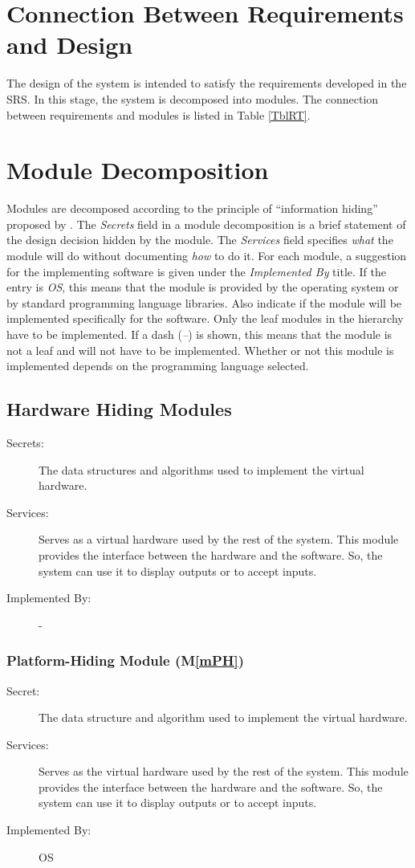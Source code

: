 \documentclass[12pt, titlepage]{article}
\newcommand{\mref}[1]{M\ref{#1}}
\begin{document}
	\section{Connection Between Requirements and Design} \label{SecConnection}
	The design of the system is intended to satisfy the requirements developed 
	in the SRS. In this stage, the system is decomposed into modules. The 
	connection between requirements and modules is listed in Table \ref{TblRT}.
	\section{Module Decomposition} \label{SecMD}
	Modules are decomposed according to the principle of ``information hiding''
	proposed by \citet{ParnasEtAl1984}. The \emph{Secrets} field in a module
	decomposition is a brief statement of the design decision hidden by the
	module. The \emph{Services} field specifies \emph{what} the module will do
	without documenting \emph{how} to do it. For each module, a suggestion for 
	the implementing software is given under the \emph{Implemented By} title. 
	If the entry is \emph{OS}, this means that the module is provided by the 
	operating system or by standard programming language libraries.  Also 
	indicate if the module will be implemented specifically for the software.
	Only the leaf modules in the hierarchy have to be implemented. If a dash 
	(\emph{--}) is shown, this means that the module is not a leaf and will not 
	have to be implemented. Whether or not this module is implemented depends 
	on the programming language selected.
	\subsection{Hardware Hiding Modules}
	\begin{description}
		\item[Secrets:]The data structures and algorithms used to implement the 
		virtual hardware.
		\item[Services:]Serves as a virtual hardware used by the rest of the 
		system. This module provides the interface between the hardware and the 
		software. So, the system can use it to display outputs or to accept 
		inputs.
		\item[Implemented By:] -
	\end{description}
	\subsubsection{Platform-Hiding Module (\mref{mPH})}
	\begin{description}
		\item[Secret:]The data structure and algorithm used to implement the 
		virtual hardware.
		\item[Services:]Serves as the virtual hardware used by the rest of the 
		system. This module provides the interface between the hardware and the 
		software. So, the system can use it to display outputs or to accept 
		inputs.
		\item[Implemented By:] OS
	\end{description}
\end{document}
